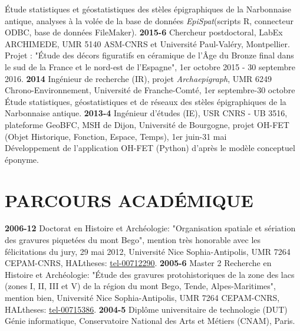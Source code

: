 \documentclass{article}
\begin{document}
\hspace*{0.5cm} Étude statistiques et géostatistiques des stèles épigraphiques de la Narbonnaise antique, analyses à la volée de la base de données \textit{EpiSpat}(scripts R, connecteur ODBC, base de données FileMaker).
\smallbreak
\textbf{2015-6} Chercheur postdoctoral, LabEx ARCHIMEDE, UMR 5140 ASM-CNRS et Université Paul-Valéry, Montpellier. Projet : "Étude des décors figuratifs en céramique de l'Âge du Bronze final dans le sud de la France et le nord-est de l'Espagne", 1er octobre 2015 - 30 septembre 2016.
\smallbreak
\textbf{2014} Ingénieur de recherche (IR), projet \textit{Archaepigraph}, UMR 6249 Chrono-Environnement, Université de Franche-Comté, 1er septembre-30 octobre \\
\hspace*{0.5cm} Étude statistiques, géostatistiques et de réseaux des stèles épigraphiques de la Narbonnaise antique.
\smallbreak
\textbf{2013-4} Ingénieur d'études (IE), USR CNRS - UB 3516, plateforme GeoBFC, MSH de Dijon, Université de Bourgogne, projet OH-FET (Objet Historique, Fonction, Espace, Temps), 1er juin-31 mai \\
\hspace*{0.5cm}  Développement de l'application OH-FET (Python) d'après le modèle conceptuel éponyme.

\section{PARCOURS ACADÉMIQUE}

\textbf{2006-12} Doctorat en Histoire et Archéologie: "Organisation spatiale et sériation des gravures piquetées du mont Bego", mention très honorable avec les félicitations du jury, 29 mai 2012, Université Nice Sophia-Antipolis, UMR 7264 CEPAM-CNRS, HALtheses: \href{https://tel.archives-ouvertes.fr/tel-00712290}{tel-00712290}.
\smallbreak
\textbf{2005-6} Master 2 Recherche en Histoire et Archéologie: "Étude des gravures protohistoriques de la zone des lacs (zones I, II, III et V) de la région du mont Bego, Tende, Alpes-Maritimes", mention bien, Université Nice Sophia-Antipolis, UMR 7264 CEPAM-CNRS, HALtheses: \href{https://tel.archives-ouvertes.fr/tel-00715386}{tel-00715386}.
\smallbreak
\textbf{2004-5} Diplôme universitaire de technologie (DUT) Génie informatique, Conservatoire National des Arts et Métiers (CNAM), Paris.
\end{document}
